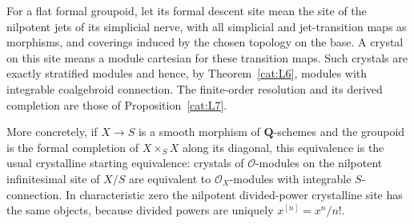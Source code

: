 \begin{proposition}\label{cat:L8}
For a flat formal groupoid, let its formal descent site mean the site
of the nilpotent jets of its simplicial nerve, with all simplicial
and jet-transition maps as morphisms, and coverings induced by the
chosen topology on the base.
A crystal on this site means a module cartesian for these transition
maps.  Such crystals are exactly stratified modules and hence, by
Theorem~\ref{cat:L6}, modules with integrable coalgebroid connection.
The finite-order resolution and its derived completion are those of
Proposition~\ref{cat:L7}.

More concretely, if $X\to S$ is a smooth morphism of
$\mathbf Q$-schemes and the groupoid is the formal completion of
$X\times_SX$ along its diagonal, this equivalence is the usual
crystalline starting equivalence: crystals of $\mathcal O$-modules
on the nilpotent infinitesimal site of $X/S$ are equivalent to
$\mathcal O_X$-modules with integrable $S$-connection.
In characteristic zero the nilpotent divided-power crystalline site
has the same objects, because divided powers are uniquely
$x^{[n]}=x^n/n!$.
\end{proposition}
